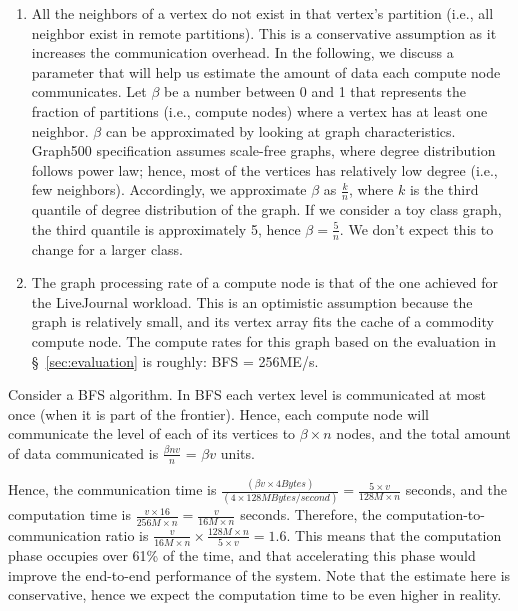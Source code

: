 \begin{enumerate}
\item All the neighbors of a vertex do not exist in that vertex's partition (i.e., all neighbor exist in remote partitions). This is a conservative assumption as it increases the communication overhead. In the following, we discuss a parameter that will help us estimate the amount of data each compute node communicates. Let $\beta$ be a number between 0 and 1 that represents the fraction of partitions (i.e., compute nodes) where a vertex has at least one neighbor. $\beta$ can be approximated by looking at graph characteristics. Graph500 specification assumes scale-free graphs, where degree distribution follows power law; hence, most of the vertices has relatively low degree (i.e., few neighbors). Accordingly, we approximate $\beta$ as $\frac{k}{n}$, where $k$ is the third quantile of degree distribution of the graph. If we consider a toy class graph, the third quantile is approximately 5, hence $\beta = \frac{5}{n}$. We don't expect this to change for a larger class.

\item The graph processing rate of a compute node is that of the one achieved for the LiveJournal workload. This is an optimistic assumption because the graph is relatively small, and its vertex array fits the cache of a commodity compute node. The compute rates for this graph based on the evaluation in \S~\ref{sec:evaluation} is roughly: BFS = 256ME/s.
\end{enumerate}

Consider a BFS algorithm. In BFS each vertex level is communicated at most once (when it is part of the frontier).  Hence, each compute node will communicate the level of each of its vertices to $\beta \times n$ nodes, and the total amount of data communicated is $\frac{\beta n v}{n}$ =  $\beta v$ units. 

Hence, the communication time is $\frac{(\beta v \times 4Bytes)}{(4 \times 128MBytes/second)} = \frac{5 \times v}{128M \times n}$ seconds, and the computation time is $\frac{v \times 16}{256M \times n} = \frac{v}{16M \times n}$ seconds. Therefore, the computation-to-communication ratio is $\frac{v}{16M \times n} \times \frac{128M \times n}{5 \times v} = 1.6$. This means that the computation phase occupies over 61\% of the time, and that accelerating this phase would improve the end-to-end performance of the system. Note that the estimate here is conservative, hence we expect the computation time to be even higher in reality.
